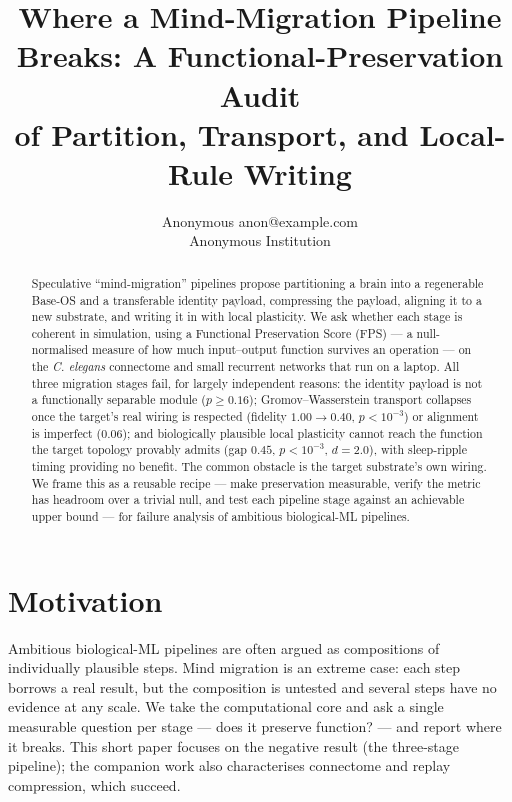 \documentclass[10pt]{article}
\title{Where a Mind-Migration Pipeline Breaks: A Functional-Preservation Audit\\
of Partition, Transport, and Local-Rule Writing}
\author{\name Anonymous \email anon@example.com \\ \addr Anonymous Institution}
\begin{document}
\maketitle

\begin{abstract}
Speculative ``mind-migration'' pipelines propose partitioning a brain into a regenerable Base-OS
and a transferable identity payload, compressing the payload, aligning it to a new substrate, and
writing it in with local plasticity. We ask whether each stage is coherent in simulation, using a
Functional Preservation Score (FPS) --- a null-normalised measure of how much input--output
function survives an operation --- on the \emph{C. elegans} connectome and small recurrent
networks that run on a laptop. All three migration stages fail, for largely independent reasons:
the identity payload is not a functionally separable module ($p\geq0.16$); Gromov--Wasserstein
transport collapses once the target's real wiring is respected (fidelity $1.00\!\to\!0.40$,
$p<10^{-3}$) or alignment is imperfect ($0.06$); and biologically plausible local plasticity
cannot reach the function the target topology provably admits (gap $0.45$, $p<10^{-3}$, $d=2.0$),
with sleep-ripple timing providing no benefit. The common obstacle is the target substrate's own
wiring. We frame this as a reusable recipe --- make preservation measurable, verify the metric has
headroom over a trivial null, and test each pipeline stage against an achievable upper bound ---
for failure analysis of ambitious biological-ML pipelines.
\end{abstract}

\section{Motivation}
Ambitious biological-ML pipelines are often argued as compositions of individually plausible
steps. Mind migration is an extreme case: each step borrows a real result, but the composition is
untested and several steps have no evidence at any scale. We take the computational core and ask a
single measurable question per stage --- does it preserve function? --- and report where it breaks.
This short paper focuses on the negative result (the three-stage pipeline); the companion work
also characterises connectome and replay compression, which succeed.
\end{document}
